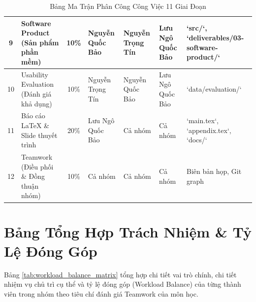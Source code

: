 \begin{table}[H]
\begin{tabularx}{\textwidth}{|c|X|c|m{2.2cm}|m{2.2cm}|m{2.2cm}|m{2.6cm}|}
    9 & Software Product (Sản phẩm phần mềm) & 10\% & Nguyễn Quốc Bảo & Nguyễn Trọng Tín & Lưu Ngô Quốc Bảo & `src/`, `deliverables/03-software-product/` \\ \hline
    10 & Usability Evaluation (Đánh giá khả dụng) & 10\% & Nguyễn Trọng Tín & Nguyễn Quốc Bảo & Lưu Ngô Quốc Bảo & `data/evaluation/` \\ \hline
    11 & Báo cáo \LaTeX{} \& Slide thuyết trình & 20\% & Lưu Ngô Quốc Bảo & Cả nhóm & Cả nhóm & `main.tex`, `appendix.tex`, `docs/` \\ \hline
    12 & Teamwork (Điều phối \& Đồng thuận nhóm) & 10\% & Cả nhóm & Cả nhóm & Cả nhóm & Biên bản họp, Git graph \\ \hline
  \end{tabularx}
  \caption{Bảng Ma Trận Phân Công Công Việc 11 Giai Đoạn}
  \label{tab:workflow_assignment_matrix}
\end{table}

\newpage
\section{Bảng Tổng Hợp Trách Nhiệm \& Tỷ Lệ Đóng Góp}

Bảng \ref{tab:workload_balance_matrix} tổng hợp chi tiết vai trò chính, chi tiết nhiệm vụ chủ trì cụ thể và tỷ lệ đóng góp (Workload Balance) của từng thành viên trong nhóm theo tiêu chí đánh giá Teamwork của môn học.

